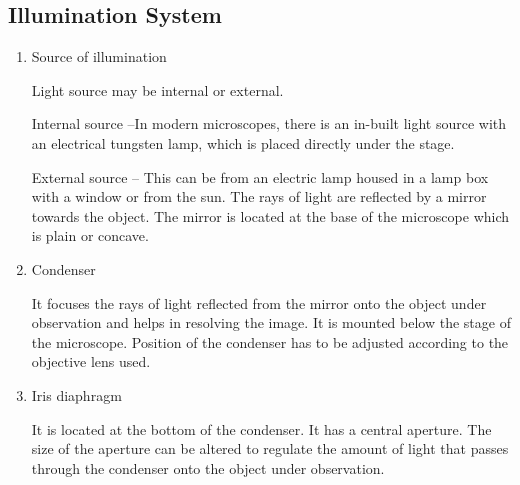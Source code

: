 \documentclass[a4paper,12pt]{book}
\begin{document}
		\subsection*{Illumination System}
		\begin{enumerate}

			\item{Source of illumination \newline
				\par Light source may be internal or external.
				\par Internal source –In modern microscopes, there is an in-built light source with an electrical tungsten lamp, which is placed directly under the stage.
				\par External source – This can be from an electric lamp housed in a lamp box with a window or from the sun. The rays of light are reflected by a mirror towards the object. The mirror is located at the base of the microscope which is plain or concave.}
			\item{Condenser
				\par It focuses the rays of light reflected from the mirror onto the object under observation and helps in resolving the image. It is mounted below the stage of the microscope. Position of the condenser has to be adjusted according to the objective lens used.}
			\item{Iris diaphragm
				\par It is located at the bottom of the condenser. It has a central aperture. The size of the aperture can be altered to regulate the amount of light that passes through the condenser onto the object under observation.}
		\end{enumerate}
\end{document}
